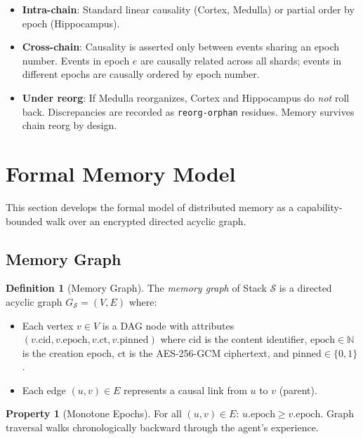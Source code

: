 \documentclass[11pt,twocolumn]{article}
\theoremstyle{definition}
\newtheorem{definition}{Definition}[section]
\newtheorem{property}{Property}[section]
\theoremstyle{plain}
\theoremstyle{remark}
\newcommand{\N}{\mathbb{N}}
\begin{document}
\begin{itemize}[leftmargin=*,itemsep=2pt]
  \item \textbf{Intra-chain}: Standard linear causality (Cortex, Medulla) or partial order by epoch (Hippocampus).
  \item \textbf{Cross-chain}: Causality is asserted only between events sharing an epoch number. Events in epoch $e$ are causally related across all shards; events in different epochs are causally ordered by epoch number.
  \item \textbf{Under reorg}: If Medulla reorganizes, Cortex and Hippocampus do \emph{not} roll back. Discrepancies are recorded as \texttt{reorg-orphan} residues. Memory survives chain reorg by design.
\end{itemize}

\section{Formal Memory Model}\label{sec:memory}

This section develops the formal model of distributed memory as a capability-bounded walk over an encrypted directed acyclic graph.

\subsection{Memory Graph}

\begin{definition}[Memory Graph]\label{def:memory-graph}
The \emph{memory graph} of Stack $\mathcal{S}$ is a directed acyclic graph $G_\mathcal{S} = (V, E)$ where:
\begin{itemize}[leftmargin=*,itemsep=1pt]
  \item Each vertex $v \in V$ is a DAG node with attributes $(v.\mathrm{cid}, v.\mathrm{epoch}, v.\mathrm{ct}, v.\mathrm{pinned})$ where $\mathrm{cid}$ is the content identifier, $\mathrm{epoch} \in \N$ is the creation epoch, $\mathrm{ct}$ is the AES-256-GCM ciphertext, and $\mathrm{pinned} \in \{0,1\}$.
  \item Each edge $(u, v) \in E$ represents a causal link from $u$ to $v$ (parent).
\end{itemize}
\end{definition}

\begin{property}[Monotone Epochs]\label{prop:monotone}
For all $(u, v) \in E$: $u.\mathrm{epoch} \geq v.\mathrm{epoch}$. Graph traversal walks chronologically backward through the agent's experience.
\end{property}
\end{document}

